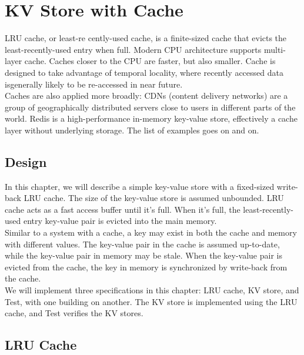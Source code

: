 % 

\usetikzlibrary{arrows.meta} %

\chapter{KV Store with Cache}

LRU cache, or least-re cently-used cache, is a finite-sized cache that evicts 
the least-recently-used entry when full. Modern CPU architecture supports
multi-layer cache. Caches closer to the CPU are faster, but also smaller. Cache is 
designed to take advantage of temporal locality, where recently accessed data isgenerally likely to be re-accessed in near future.\\

Caches are also applied more broadly: CDNs (content delivery
networks) are a group of geographically distributed servers close to
users in different parts of the world. Redis is a high-performance in-memory
key-value store, effectively a cache layer without underlying storage. The list of
examples goes on and on.

\section{Design}

In this chapter, we will describe a simple key-value store with a fixed-sized 
write-back LRU cache. The size of the key-value store is assumed unbounded. LRU
cache acts as a fast access buffer until it's full. When it's full, the
least-recently-used entry key-value pair is evicted into the main memory.\\

Similar to a system with a cache, a key may exist in both the cache and memory
with different values. The key-value pair in the cache is assumed up-to-date,
while the key-value pair in memory may be stale. When the key-value pair is
evicted from the cache, the key in memory is synchronized by write-back from
the cache.\\

We will implement three specifications in this chapter: LRU cache, KV store, and
Test, with one building on another. The KV store is implemented using the LRU
cache, and Test verifies the KV stores.

\section{LRU Cache}


